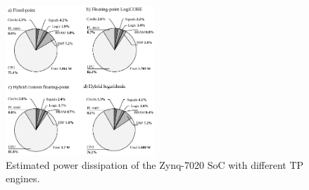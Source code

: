 \begin{figure}[t!]
	\centering
	\includegraphics[width=0.5\textwidth]{../figures/power_breackdown.pdf}
	\caption{Estimated power dissipation of the Zynq-7020 SoC with different TP engines.}
	\label{fig:power}
\end{figure}


